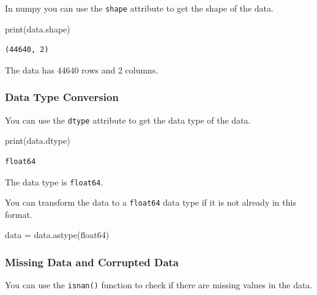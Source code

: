 \documentclass[
  letterpaper,
  DIV=11,
  numbers=noendperiod]{scrreprt}
\newenvironment{Shaded}{\begin{snugshade}}{\end{snugshade}}
\newcommand{\BuiltInTok}[1]{\textcolor[rgb]{0.00,0.23,0.31}{#1}}
\newcommand{\NormalTok}[1]{\textcolor[rgb]{0.00,0.23,0.31}{#1}}
\newcommand{\OperatorTok}[1]{\textcolor[rgb]{0.37,0.37,0.37}{#1}}
\newcommand{\StringTok}[1]{\textcolor[rgb]{0.13,0.47,0.30}{#1}}
\begin{document}
In numpy you can use the \texttt{shape} attribute to get the shape of
the data.

\begin{Shaded}
\begin{Highlighting}[]
\BuiltInTok{print}\NormalTok{(data.shape)}
\end{Highlighting}
\end{Shaded}

\begin{verbatim}
(44640, 2)
\end{verbatim}

The data has 44640 rows and 2 columns.

\subsubsection*{Data Type Conversion}\label{data-type-conversion}

You can use the \texttt{dtype} attribute to get the data type of the
data.

\begin{Shaded}
\begin{Highlighting}[]
\BuiltInTok{print}\NormalTok{(data.dtype)}
\end{Highlighting}
\end{Shaded}

\begin{verbatim}
float64
\end{verbatim}

The data type is \texttt{float64}.

You can transform the data to a \texttt{float64} data type if it is not
already in this format.

\begin{Shaded}
\begin{Highlighting}[]
\NormalTok{data }\OperatorTok{=}\NormalTok{ data.astype(}\StringTok{\textquotesingle{}float64\textquotesingle{}}\NormalTok{)}
\end{Highlighting}
\end{Shaded}

\subsubsection*{Missing Data and Corrupted
Data}\label{missing-data-and-corrupted-data}

You can use the \texttt{isnan()} function to check if there are missing
values in the data.
\end{document}

